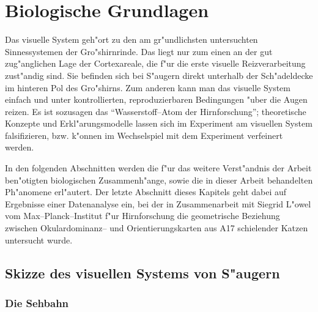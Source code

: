 \section{Biologische Grundlagen}
\label{biologie}
\thispagestyle{plain}

Das visuelle System geh"ort zu den am gr"undlichsten untersuchten
Sinnessystemen der Gro"shirnrinde.  Das liegt nur zum einen an der gut
zug"anglichen Lage der Cortexareale, die f"ur die erste visuelle
Reizverarbeitung zust"andig sind.  Sie befinden sich bei S"augern direkt
unterhalb der Sch"adeldecke im hinteren Pol des Gro"shirns.  Zum anderen
kann man das visuelle System einfach und unter kontrollierten,
reproduzierbaren Bedingungen "uber die Augen reizen. Es ist sozusagen das
``Wasserstoff--Atom der Hirnforschung''; theoretische Konzepte und
Erkl"arungsmodelle lassen sich im Experiment am visuellen System
falsifizieren, bzw. k"onnen im Wechselspiel mit dem Experiment verfeinert
werden.

In den folgenden Abschnitten werden die f"ur das weitere Verst"andnis der
Arbeit ben"otigten biologischen Zusammenh"ange, sowie die in dieser Arbeit
behandelten Ph"anomene erl"autert. Der letzte Abschnitt dieses Kapitels
geht dabei auf Ergebnisse einer Datenanalyse ein, bei der in Zusammenarbeit
mit Siegrid L"owel vom Max--Planck--Institut f"ur Hirnforschung die
geometrische Beziehung zwischen Okulardominanz-- und Orientierungskarten
aus A17 schielender Katzen untersucht wurde.

\subsection{Skizze des visuellen Systems von S"augern}

\subsubsection{Die Sehbahn}
\label{sehbahnkap}

